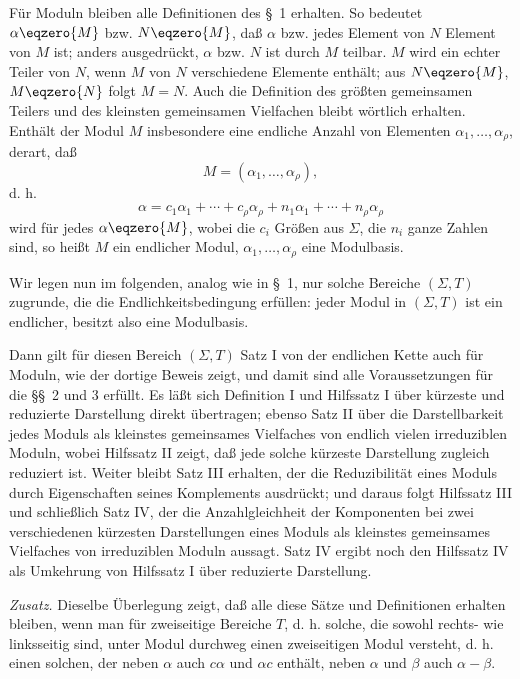 \documentclass[11pt]{article}
\begin{document}
Für Moduln bleiben alle Definitionen des \S~1 erhalten. So bedeutet $\alpha\eqzero{M}$ bzw. $N\eqzero{M}$, daß $\alpha$ bzw. jedes Element von $N$ Element von $M$ ist; anders ausgedrückt, $\alpha$ bzw. $N$ ist durch $M$ teilbar. $M$ wird ein echter Teiler von $N$, wenn $M$ von $N$ verschiedene Elemente enthält; aus $N\eqzero{M}$, $M\eqzero{N}$ folgt $M=N$. Auch die Definition des größten gemeinsamen Teilers und des kleinsten gemeinsamen Vielfachen bleibt wörtlich erhalten. Enthält der Modul $M$ insbesondere eine endliche Anzahl von Elementen $\alpha_1,\ldots,\alpha_\rho$, derart, daß
\[
 M=(\alpha_1,
\ldots,\alpha_\rho),
\]
d. h.
\[
 \alpha=c_1\alpha_1+\cdots+c_\rho\alpha_\rho
       +n_1\alpha_1+\cdots+n_\rho\alpha_\rho
\]
wird für jedes $\alpha\eqzero{M}$, wobei die $c_i$ Größen aus $\Sigma$, die $n_i$ ganze Zahlen sind, so heißt $M$ ein endlicher Modul, $\alpha_1,\ldots,\alpha_\rho$ eine Modulbasis.

Wir legen nun im folgenden, analog wie in \S~1, nur solche Bereiche $(\Sigma,T)$ zugrunde, die die Endlichkeitsbedingung erfüllen: jeder Modul in $(\Sigma,T)$ ist ein endlicher, besitzt also eine Modulbasis.

Dann gilt für diesen Bereich $(\Sigma,T)$ Satz I von der endlichen Kette auch für Moduln, wie der dortige Beweis zeigt, und damit sind alle Voraussetzungen für die \S\S~2 und 3 erfüllt. Es läßt sich Definition I und Hilfssatz I über kürzeste und reduzierte Darstellung direkt übertragen; ebenso Satz II über die Darstellbarkeit jedes Moduls als kleinstes gemeinsames Vielfaches von endlich vielen irreduziblen Moduln, wobei Hilfssatz II zeigt, daß jede solche kürzeste Darstellung zugleich reduziert ist. Weiter bleibt Satz III erhalten, der die Reduzibilität eines Moduls durch Eigenschaften seines Komplements ausdrückt; und daraus folgt Hilfssatz III und schließlich Satz IV, der die Anzahlgleichheit der Komponenten bei zwei verschiedenen kürzesten Darstellungen eines Moduls als kleinstes gemeinsames Vielfaches von irreduziblen Moduln aussagt. Satz IV ergibt noch den Hilfssatz IV als Umkehrung von Hilfssatz I über reduzierte Darstellung.

\emph{Zusatz.} Dieselbe Überlegung zeigt, daß alle diese Sätze und Definitionen erhalten bleiben, wenn man für zweiseitige Bereiche $T$, d. h. solche, die sowohl rechts- wie linksseitig sind, unter Modul durchweg einen zweiseitigen Modul versteht, d. h. einen solchen, der neben $\alpha$ auch $c\alpha$ und $\alpha c$ enthält, neben $\alpha$ und $\beta$ auch $\alpha-\beta$.
\end{document}
